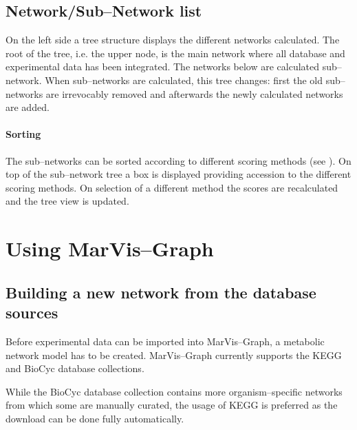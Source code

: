 \documentclass[titlepage,a4paper,twoside,9pt]{article}
\newcommand{\mg}{Mar\-Vis--Graph\xspace}
\newcommand{\pref}[1]{\prettyref{#1}}
\begin{document}
\subsection{Network/Sub--Network list}

On the left side a tree structure displays the different networks calculated.
The root of the tree, i.e. the upper node, is the main network where all
database and experimental data has been integrated. The networks below are
calculated sub--network. When sub--networks are calculated, this tree changes:
first the old sub--networks are irrevocably removed and afterwards the newly
calculated networks are added.

\paragraph{Sorting} The sub--networks can be sorted according to different
scoring methods (see \pref{sssec:scoring}). On top of the sub--network tree a
box is displayed providing accession to the different scoring methods. On
selection of a different method the scores are recalculated and the tree view
is updated.

\section{Using \mg}

\subsection{Building a new network from the database
sources}\label{ssec:newnetwork}

Before experimental data can be imported into \mg, a metabolic network model
has to be created. \mg currently supports the KEGG and BioCyc database
collections.

While the BioCyc database collection contains more organism--specific networks
from which some are manually curated, the usage of KEGG is preferred as the
download can be done fully automatically.
\end{document}
